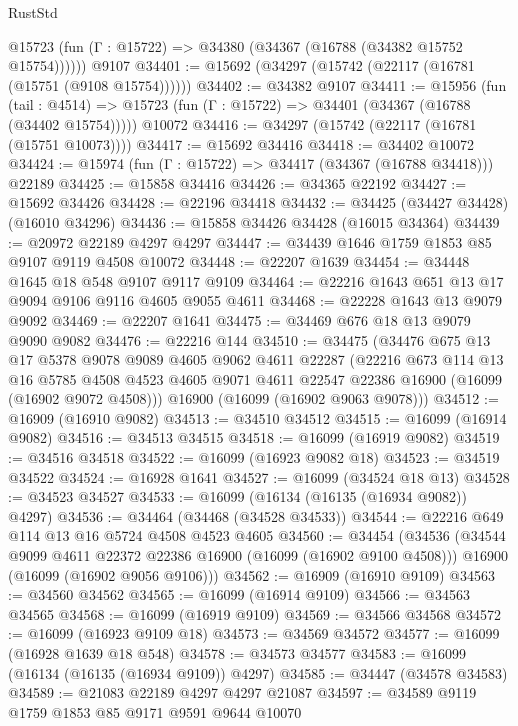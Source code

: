 \begin{lexlean}{RustStd}
\begin{coremodule}
      @15723 (fun (Γ : @15722) => @34380 (@34367 (@16788 (@34382 @15752 @15754))))))
    @9107
@34401 := @15692 (@34297 (@15742 (@22117 (@16781 (@15751 (@9108 @15754))))))
@34402 := @34382 @9107
@34411 := @15956
    (fun (tail : @4514) => @15723 (fun (Γ : @15722) => @34401 (@34367 (@16788 (@34402 @15754)))))
    @10072
@34416 := @34297 (@15742 (@22117 (@16781 (@15751 @10073))))
@34417 := @15692 @34416
@34418 := @34402 @10072
@34424 := @15974 (fun (Γ : @15722) => @34417 (@34367 (@16788 @34418))) @22189
@34425 := @15858 @34416
@34426 := @34365 @22192
@34427 := @15692 @34426
@34428 := @22196 @34418
@34432 := @34425 (@34427 @34428) (@16010 @34296)
@34436 := @15858 @34426 @34428 (@16015 @34364)
@34439 := @20972 @22189 @4297 @4297
@34447 := @34439 @1646 @1759 @1853 @85 @9107 @9119 @4508 @10072
@34448 := @22207 @1639
@34454 := @34448 @1645 @18 @548 @9107 @9117 @9109
@34464 := @22216 @1643 @651 @13 @17 @9094 @9106 @9116 @4605 @9055 @4611
@34468 := @22228 @1643 @13 @9079 @9092
@34469 := @22207 @1641
@34475 := @34469 @676 @18 @13 @9079 @9090 @9082
@34476 := @22216 @144
@34510 := @34475
    (@34476
      @675
      @13
      @17
      @5378
      @9078
      @9089
      @4605
      @9062
      @4611
      @22287
      (@22216
        @673
        @114
        @13
        @16
        @5785
        @4508
        @4523
        @4605
        @9071
        @4611
        @22547
        @22386
        @16900
        (@16099 (@16902 @9072 @4508)))
      @16900
      (@16099 (@16902 @9063 @9078)))
@34512 := @16909 (@16910 @9082)
@34513 := @34510 @34512
@34515 := @16099 (@16914 @9082)
@34516 := @34513 @34515
@34518 := @16099 (@16919 @9082)
@34519 := @34516 @34518
@34522 := @16099 (@16923 @9082 @18)
@34523 := @34519 @34522
@34524 := @16928 @1641
@34527 := @16099 (@34524 @18 @13)
@34528 := @34523 @34527
@34533 := @16099 (@16134 (@16135 (@16934 @9082)) @4297)
@34536 := @34464 (@34468 (@34528 @34533))
@34544 := @22216 @649 @114 @13 @16 @5724 @4508 @4523 @4605
@34560 := @34454
    (@34536
      (@34544 @9099 @4611 @22372 @22386 @16900 (@16099 (@16902 @9100 @4508)))
      @16900
      (@16099 (@16902 @9056 @9106)))
@34562 := @16909 (@16910 @9109)
@34563 := @34560 @34562
@34565 := @16099 (@16914 @9109)
@34566 := @34563 @34565
@34568 := @16099 (@16919 @9109)
@34569 := @34566 @34568
@34572 := @16099 (@16923 @9109 @18)
@34573 := @34569 @34572
@34577 := @16099 (@16928 @1639 @18 @548)
@34578 := @34573 @34577
@34583 := @16099 (@16134 (@16135 (@16934 @9109)) @4297)
@34585 := @34447 (@34578 @34583)
@34589 := @21083 @22189 @4297 @4297 @21087
@34597 := @34589 @9119 @1759 @1853 @85 @9171 @9591 @9644 @10070

\end{coremodule}
\end{lexlean}

